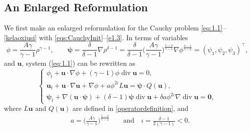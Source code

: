 \documentclass[11pt,reqno]{amsart}
\DeclareMathOperator{\diver}{\mathrm{div}}
\numberwithin{rk}{section}
\numberwithin{prop}{section}
\numberwithin{mydef}{section}
\numberwithin{lem}{section}
\numberwithin{equation}{section}
\numberwithin{thm}{section}
\begin{document}
\subsection{An Enlarged Reformulation}\label{see1}

We first make an enlarged  reformulation for the Cauchy problem \eqref{eq:1.1}--\eqref{kelaoxiusi} with \eqref{eqs:CauchyInit}--\eqref{e1.3}. In terms of variables
\begin{equation}\label{bianliang}
\phi=\frac{A\gamma}{\gamma-1} \rho^{\gamma-1},\qquad \boldsymbol{\psi}=\frac{\delta}{\delta-1}\nabla \rho^{\delta-1}=\frac{\delta}{\delta-1}\big(\frac{A\gamma}{\gamma-1}\big)^{\frac{1-\delta}{\gamma-1}}\nabla \phi^{\frac{\delta-1}{\gamma-1}}=(\psi_{1},\psi_{2},\psi_{3})^\top,
\end{equation}
and $\boldsymbol{u}$, system (\ref{eq:1.1})  can be rewritten as
\begin{equation}\label{eq:cccq}
\begin{cases}
\displaystyle
\phi_t+\boldsymbol{u}\cdot \nabla \phi+(\gamma-1)\phi \diver \boldsymbol{u}=0,\\[4pt]
\displaystyle
\boldsymbol{u}_t+\boldsymbol{u}\cdot\nabla \boldsymbol{u} +\nabla \phi+a\phi^{2\iota}L\boldsymbol{u}=\boldsymbol{\psi} \cdot Q(\boldsymbol{u}),\\[4pt]
\displaystyle
\boldsymbol{\psi}_t+\nabla (\boldsymbol{u}\cdot \boldsymbol{\psi})+(\delta-1)\boldsymbol{\psi}\diver \boldsymbol{u} +\delta a\phi^{2\iota}\nabla \diver \boldsymbol{u}=\boldsymbol{0},
 \end{cases}
\end{equation}
where $L \boldsymbol{u}$ and $Q(\boldsymbol{u})$ are  defined in \eqref{operatordefinition}, and 
\begin{equation} \label{xishu}
\begin{aligned}
& a=\big(\frac{A\gamma}{\gamma-1}\big)^{\frac{1-\delta}{\gamma-1}} \qquad \text{and} \quad \iota=\frac{\delta-1}{2(\gamma-1)}<0.
\end{aligned}
\end{equation}
\end{document}
